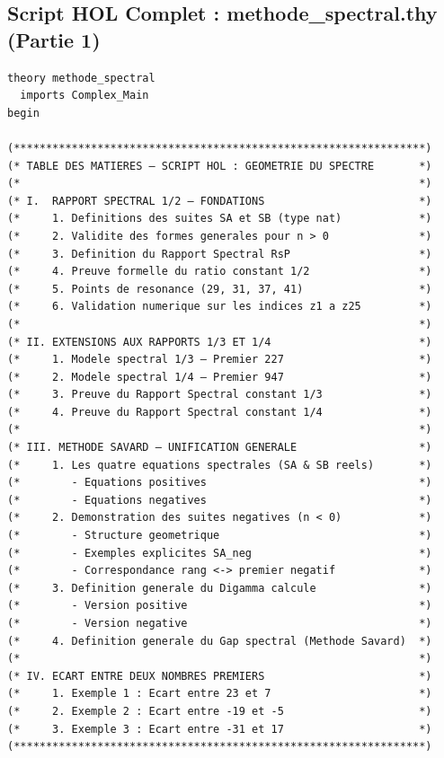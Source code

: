 \documentclass[a4paper,11pt]{article}
\begin{document}
\subsection{Script HOL Complet : methode\_spectral.thy (Partie 1)}

\begin{holcode}[title={\textcolor{white}{Fichier : methode\_spectral.thy -- Partie 1/4}}]
\begin{lstlisting}
theory methode_spectral
  imports Complex_Main
begin

(****************************************************************)
(* TABLE DES MATIERES – SCRIPT HOL : GEOMETRIE DU SPECTRE       *)
(*                                                              *)
(* I.  RAPPORT SPECTRAL 1/2 – FONDATIONS                        *)
(*     1. Definitions des suites SA et SB (type nat)            *)
(*     2. Validite des formes generales pour n > 0              *)
(*     3. Definition du Rapport Spectral RsP                    *)
(*     4. Preuve formelle du ratio constant 1/2                 *)
(*     5. Points de resonance (29, 31, 37, 41)                  *)
(*     6. Validation numerique sur les indices z1 a z25         *)
(*                                                              *)
(* II. EXTENSIONS AUX RAPPORTS 1/3 ET 1/4                       *)
(*     1. Modele spectral 1/3 – Premier 227                     *)
(*     2. Modele spectral 1/4 – Premier 947                     *)
(*     3. Preuve du Rapport Spectral constant 1/3               *)
(*     4. Preuve du Rapport Spectral constant 1/4               *)
(*                                                              *)
(* III. METHODE SAVARD – UNIFICATION GENERALE                   *)
(*     1. Les quatre equations spectrales (SA & SB reels)       *)
(*        - Equations positives                                 *)
(*        - Equations negatives                                 *)
(*     2. Demonstration des suites negatives (n < 0)            *)
(*        - Structure geometrique                               *)
(*        - Exemples explicites SA_neg                          *)
(*        - Correspondance rang <-> premier negatif             *)
(*     3. Definition generale du Digamma calcule                *)
(*        - Version positive                                    *)
(*        - Version negative                                    *)
(*     4. Definition generale du Gap spectral (Methode Savard)  *)
(*                                                              *)
(* IV. ECART ENTRE DEUX NOMBRES PREMIERS                        *)
(*     1. Exemple 1 : Ecart entre 23 et 7                       *)
(*     2. Exemple 2 : Ecart entre -19 et -5                     *)
(*     3. Exemple 3 : Ecart entre -31 et 17                     *)
(****************************************************************)


\end{lstlisting}
\end{holcode}
\end{document}
